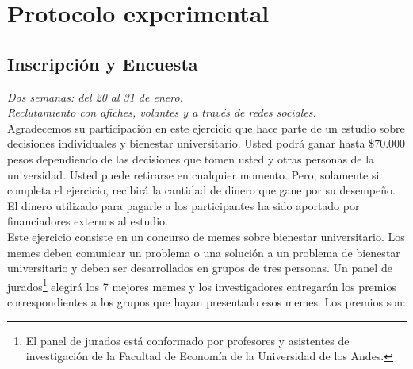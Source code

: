 \section{Protocolo experimental}
\subsection{Inscripción y Encuesta}
\textit{Dos semanas: del 20 al 31 de enero.\\
Reclutamiento con afiches, volantes y a través de redes sociales.\\}
Agradecemos su participación en este ejercicio que hace parte de un estudio sobre decisiones individuales y bienestar universitario. Usted podrá ganar hasta \$70.000 pesos dependiendo de las decisiones que tomen usted y otras personas de la universidad. Usted puede retirarse en cualquier momento. Pero, solamente si completa el ejercicio, recibirá la cantidad de dinero que gane por su desempeño. \\
El dinero utilizado para pagarle a los participantes ha sido aportado por financiadores externos al estudio.\\

Este ejercicio consiste en un concurso de memes sobre bienestar universitario. Los memes deben comunicar un problema o una solución a un problema de bienestar universitario y deben ser desarrollados en grupos de tres personas. Un panel de jurados\footnote{El panel de jurados está conformado por profesores y asistentes de investigación de la Facultad de Economía de la Universidad de los Andes.} elegirá los 7 mejores memes y los investigadores entregarán los premios correspondientes a los grupos que hayan presentado esos memes. Los premios son:


